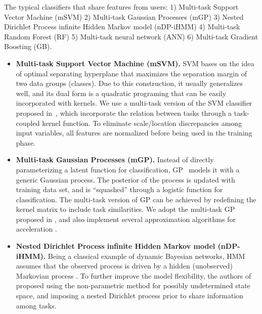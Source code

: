 The typical classifiers that share features from users:  1) Multi-task Support Vector Machine (mSVM) 2) Multi-task Gaussian Processes (mGP) 3) Nested Dirichlet Process infinite Hidden Markov model (nDP-iHMM) 4) Multi-task Random Forest (RF) 5) Multi-task neural network (ANN) 6) Multi-task Gradient Boosting (GB).



\begin{itemize}
\item
\textbf{Multi-task Support Vector Machine (mSVM).}
SVM \cite{bib:wang2005support} bases on the idea of optimal separating hyperplane that maximizes the separation margin of two data groups (classes).
Due to this construction, it usually generalizes well, and its dual form is a quadratic programing that can be easily incorporated with kernels.
We use a multi-task version of the SVM classifier proposed in~\cite{evgeniou2004regularized}, which incorporate the relation between tasks through a task-coupled kernel function. To eliminate scale/location discrepancies among input variables, all features are normalized before being used in the training phase.

\item
\textbf{Multi-task Gaussian Processes (mGP).}
Instead of directly parameterizing a latent function for classification, GP~\cite{bib:rasmussen2006gaussian} models it with a generic Gaussian process.
The posterior of the process is updated with training data set, and is ``squashed'' through a logistic function for classification. The multi-task version of GP can be achieved by redefining the kernel matrix to include task similarities. We adopt the multi-task GP proposed in \cite{bonilla2007multi}, and also implement several approximation algorithms for acceleration \cite{bib:chalupka2013framework}.

\item
\textbf{Nested Dirichlet Process infinite Hidden Markov model (nDP-iHMM).}
Being a classical example of dynamic Bayesian networks, HMM assumes that the observed process is driven by a hidden (unobserved) Markovian process \cite{bib:rabiner1986introduction}.  To further improve the model flexibility, the authors of \cite{ni2007multi} proposed using the non-parametric method for possibly undetermined state space, and imposing a nested Dirichlet process prior to share information among tasks.






\end{itemize}

